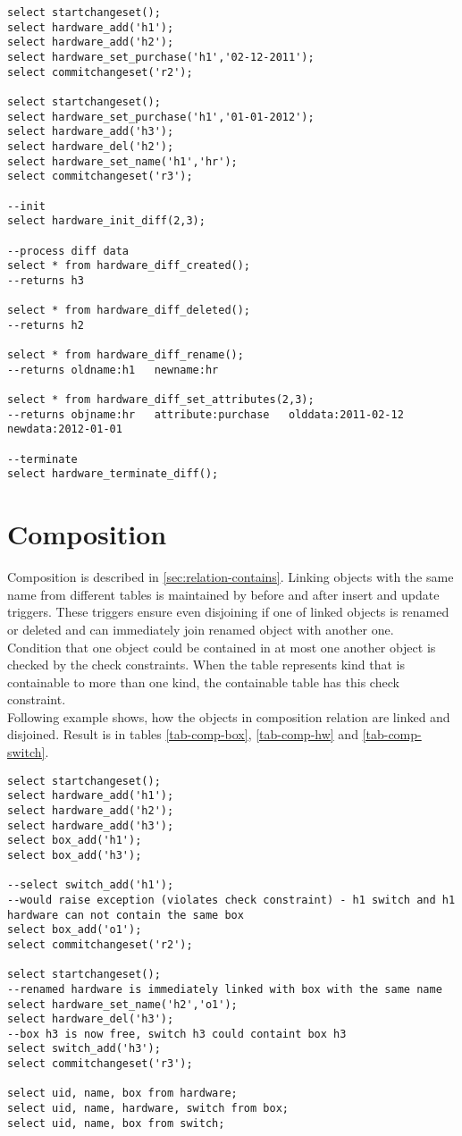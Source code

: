 \documentclass[deska]{subfiles}
\begin{document}
\begin{verbatim}
select startchangeset();
select hardware_add('h1');
select hardware_add('h2');
select hardware_set_purchase('h1','02-12-2011');
select commitchangeset('r2');

select startchangeset();
select hardware_set_purchase('h1','01-01-2012');
select hardware_add('h3');
select hardware_del('h2');
select hardware_set_name('h1','hr');
select commitchangeset('r3');

--init
select hardware_init_diff(2,3);

--process diff data
select * from hardware_diff_created();
--returns h3

select * from hardware_diff_deleted();
--returns h2

select * from hardware_diff_rename();
--returns oldname:h1   newname:hr

select * from hardware_diff_set_attributes(2,3);
--returns objname:hr   attribute:purchase   olddata:2011-02-12   newdata:2012-01-01

--terminate
select hardware_terminate_diff();
\end{verbatim}

\section{Composition}
Composition is described in \ref{sec:relation-contains}.
Linking objects with the same name from different tables is maintained by before and after insert and update triggers. These triggers ensure even disjoining if one of linked objects is renamed or deleted and can immediately join renamed object with another one.\\
Condition that one object could be contained in at most one another object is checked by the check constraints. When the table represents kind that is containable to more than one kind, the containable table has this check constraint.\\
Following example shows, how the objects in composition relation are linked and disjoined. Result is in tables \ref{tab-comp-box}, \ref{tab-comp-hw} and \ref{tab-comp-switch}.

\begin{verbatim}
select startchangeset();
select hardware_add('h1');
select hardware_add('h2');
select hardware_add('h3');
select box_add('h1');
select box_add('h3');

--select switch_add('h1');
--would raise exception (violates check constraint) - h1 switch and h1 hardware can not contain the same box
select box_add('o1');
select commitchangeset('r2');

select startchangeset();
--renamed hardware is immediately linked with box with the same name
select hardware_set_name('h2','o1');
select hardware_del('h3');
--box h3 is now free, switch h3 could containt box h3
select switch_add('h3');
select commitchangeset('r3');

select uid, name, box from hardware;
select uid, name, hardware, switch from box;
select uid, name, box from switch;
\end{verbatim}
\end{document}

